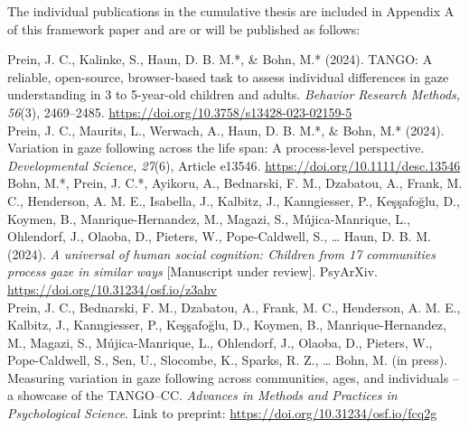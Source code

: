 \documentclass[
]{scrbook}
\begin{document}
\begin{titlepage}
\begin{flushleft}
\begin{normalsize}
                The individual publications in the cumulative thesis are included in Appendix A of this framework paper and are or will be published as follows: \\[5mm]
                
                \begin{hangparas}{5mm}{1}

Prein, J. C., Kalinke, S., Haun, D. B. M.*, \& Bohn, M.* (2024). TANGO: A reliable, open-source, browser-based task to assess individual differences in gaze understanding in 3 to 5-year-old children and adults. \textit{Behavior Research Methods, 56}(3), 2469–2485. \mbox{\url{https://doi.org/10.3758/s13428-023-02159-5}} \\[5mm]

Prein, J. C., Maurits, L., Werwach, A., Haun, D. B. M.*, \& Bohn, M.* (2024). Variation in gaze following across the life span: A process-level perspective. \textit{Developmental Science, 27}(6), Article e13546. \mbox{\url{https://doi.org/10.1111/desc.13546}} \\[5mm]

Bohn, M.*, Prein, J. C.*, Ayikoru, A., Bednarski, F. M., Dzabatou, A., Frank, M. C., Henderson, A. M. E., Isabella, J., Kalbitz, J., Kanngiesser, P., Keşşafoğlu, D., Koymen, B., Manrique-Hernandez, M., Magazi, S., Mújica-Manrique, L., Ohlendorf, J., Olaoba, D., Pieters, W., Pope-Caldwell, S., … Haun, D. B. M.(2024). \textit{A universal of human social cognition: Children from 17 communities process gaze in similar ways} [Manuscript under review]. PsyArXiv. \mbox{\url{https://doi.org/10.31234/osf.io/z3ahv}} \\[5mm]

Prein, J. C., Bednarski, F. M., Dzabatou, A., Frank, M. C., Henderson, A. M. E., Kalbitz, J., Kanngiesser, P., Keşşafoğlu, D., Koymen, B., Manrique-Hernandez, M., Magazi, S., Mújica-Manrique, L., Ohlendorf, J., Olaoba, D., Pieters, W., Pope-Caldwell, S., Sen, U., Slocombe, K., Sparks, R. Z., … Bohn, M. (in press). Measuring variation in gaze following across communities, ages, and individuals – a showcase of the TANGO–CC. \textit{Advances in Methods and Practices in Psychological Science}. Link to preprint: \mbox{\url{https://doi.org/10.31234/osf.io/fcq2g}}

                \end{hangparas}
        \end{normalsize}
    \end{flushleft}
    
\end{titlepage}
\end{document}
